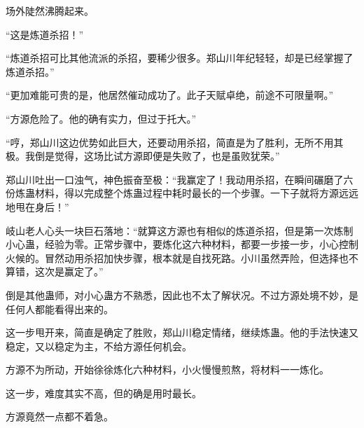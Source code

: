 \begin{this_body}
场外陡然沸腾起来。

“这是炼道杀招！”

“炼道杀招可比其他流派的杀招，要稀少很多。郑山川年纪轻轻，却是已经掌握了炼道杀招。”

“更加难能可贵的是，他居然催动成功了。此子天赋卓绝，前途不可限量啊。”

“方源危险了。他的确有实力，但过于托大。”

“哼，郑山川这边优势如此巨大，还要动用杀招，简直是为了胜利，无所不用其极。我倒是觉得，这场比试方源即便是失败了，也是虽败犹荣。”

郑山川吐出一口浊气，神色振奋至极：“我赢定了！我动用杀招，在瞬间碾磨了六份炼蛊材料，得以完成整个炼蛊过程中耗时最长的一个步骤。一下子就将方源远远地甩在身后！”

岐山老人心头一块巨石落地：“就算这方源也有相似的炼道杀招，但是第一次炼制小心蛊，经验为零。正常步骤中，要炼化这六种材料，都要一步接一步，小心控制火候的。冒然动用杀招加快步骤，根本就是自找死路。小川虽然弄险，但选择也不算错，这次是赢定了。”

倒是其他蛊师，对小心蛊方不熟悉，因此也不太了解状况。不过方源处境不妙，是任何人都能看得出来的。

这一步甩开来，简直是确定了胜败，郑山川稳定情绪，继续炼蛊。他的手法快速又稳定，又以稳定为主，不给方源任何机会。

方源不为所动，开始徐徐炼化六种材料，小火慢慢煎熬，将材料一一炼化。

这一步，难度其实不高，但的确是用时最长。

方源竟然一点都不着急。

\end{this_body}

